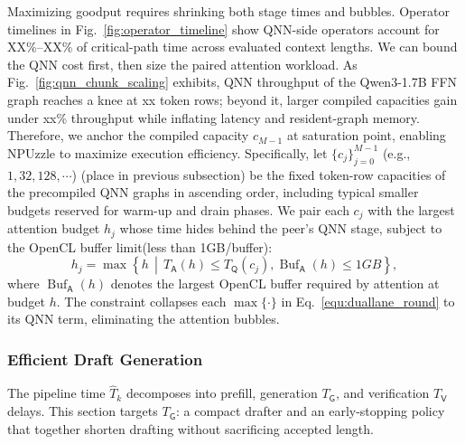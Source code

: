 \documentclass[sigconf,nonacm,10pt]{acmart}
\newcommand{\name}{NPUzzle\xspace}
\begin{document}
Maximizing goodput requires shrinking both stage times and bubbles. Operator timelines in {\color{red}Fig.~\ref{fig:operator_timeline}} show QNN-side operators account for {\color{red}XX\%--XX\%}  %
of critical-path time across evaluated context lengths. We can bound the QNN cost first, then size the paired attention workload.
As Fig.~\ref{fig:qnn_chunk_scaling} exhibits, QNN throughput of the Qwen3-1.7B FFN graph reaches a knee at {\color{red}xx} token rows; beyond it, larger compiled capacities gain under {\color{red}xx\%} throughput while inflating latency and resident-graph memory. 
{\color{blue}
Therefore, we anchor the compiled capacity $c_{M-1}$ at saturation point, enabling \name to maximize execution efficiency.
}
{\color{red}
Specifically, let $\{c_j\}_{j=0}^{M-1}$ (e.g., ${1, \!32, \!128, \!\cdots}$) (place in previous subsection)} be the fixed token-row capacities of the precompiled QNN graphs in ascending order, including typical smaller budgets reserved for warm-up and drain phases. We pair each $c_j$ with the largest attention budget $h_j$ whose time hides behind the peer's QNN stage, subject to the OpenCL buffer limit(less than 1GB/buffer):
\begin{equation}
h_j=\max\left\{h \,\middle|\, T_{\mathsf A}(h)\le T_{\mathsf Q}(c_j),\operatorname{Buf}_{\mathsf A}(h)\le1GB \right\},
\label{equ:lane_capacity}
\end{equation}
where $\operatorname{Buf}_{\mathsf A}(h)$ denotes the largest OpenCL buffer required by attention at budget $h$.
The constraint collapses each $\max\{\cdot\}$ in Eq.~\eqref{equ:duallane_round} to its QNN term, eliminating the attention bubbles. %


\subsubsection{Efficient Draft Generation} \label{sec:execution_draft}
The pipeline time $\widehat T_k$ decomposes into prefill, generation $T_{\mathsf G}$, and verification $T_{\mathsf V}$ delays. This section targets $T_{\mathsf G}$: a compact drafter and an early-stopping policy that together shorten drafting without sacrificing accepted length.
\end{document}
